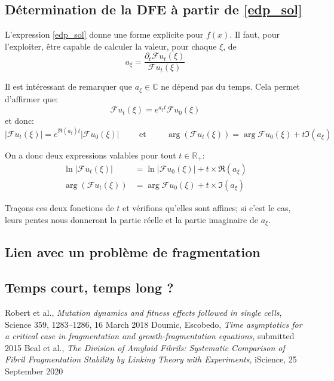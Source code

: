 \documentclass[12pt]{article}
\newcommand{\pth}[1]{\left(#1\right)}
\newcommand{\abs}[1]{\left|#1\right|}
\newcommand{\et}{\hspace{1cm}\text{et}\hspace{1cm}}
\newcommand{\Ce}{\mathbb{C}}
\newcommand{\Er}{\mathbb{R}}
\newcommand{\dr}{\partial}
\newcommand{\fr}{\mathcal{F}}
\begin{document}
\subsection{Détermination de la DFE à partir de \eqref{edp_sol}}

L'expression \eqref{edp_sol} donne une forme explicite pour $f(x)$. Il faut, pour l'exploiter, être capable de calculer la valeur, pour chaque $\xi$, de
\[a_{\xi}=\frac{\dr_t\fr u_t(\xi)}{\fr u_t(\xi)}\]

Il est intéressant de remarquer que $a_{\xi}\in\Ce$ ne dépend pas du temps. Cela permet d'affirmer que:
\[\fr u_t(\xi)=e^{a_{\xi}t}\fr u_0(\xi)\] et donc:
\[\abs{\fr u_t(\xi)}=e^{\Re(a_{\xi})t}\abs{\fr u_0(\xi)} \et \arg\pth{\fr u_t(\xi)}=\arg{\fr u_0(\xi)}+t\Im(a_{\xi})\]

On a donc deux expressions valables pour tout $t\in \Er_+$:
\begin{align*}
  \ln\abs{\fr u_t(\xi)}&=\ln\abs{\fr u_0(\xi)}+t\times\Re(a_{\xi})\\
  \arg\pth{\fr u_t(\xi)}&=\arg{\fr u_0(\xi)}+t\times\Im(a_{\xi})
\end{align*}

Traçons ces deux fonctions de $t$ et vérifions qu'elles sont affines; si c'est le cas, leurs pentes nous donneront la partie réelle et la partie imaginaire de $a_{\xi}$.

\subsection{Lien avec un problème de fragmentation}



\subsection{Temps court, temps long ?}



\begin{thebibliography}{1}

  Robert et al.,
  \emph{Mutation dynamics and fitness effects followed in single cells}, Science 359, 1283–1286, 16 March 2018
  Doumic, Escobedo,
  \emph{Time asymptotics for a critical case in fragmentation and growth-fragmentation equations}, submitted 2015
  Beal et al.,
  \emph{The Division of Amyloid Fibrils: Systematic Comparison of Fibril Fragmentation Stability by Linking Theory with Experiments}, iScience, 25 September 2020
\end{thebibliography}
\end{document}
